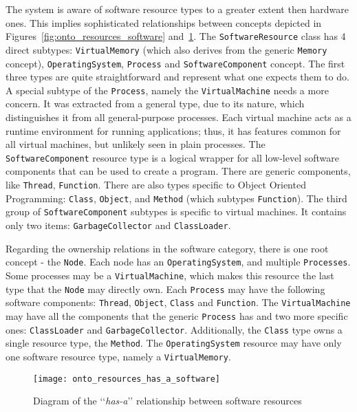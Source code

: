The system is aware of software resource types to a greater extent then hardware ones. This implies sophisticated relationships between concepts depicted in Figures~\ref{fig:onto_resources_software} and~\ref{fig:onto_resources_has_a_software}. The \texttt{SoftwareResource} class has 4 direct subtypes: \texttt{VirtualMemory} (which also derives from the generic \texttt{Memory} concept), \texttt{OperatingSystem}, \texttt{Process} and \texttt{SoftwareComponent} concept. The first three types are quite straightforward and represent what one expects them to do. A special subtype of the \texttt{Process}, namely the \texttt{VirtualMachine} needs a more concern. It was extracted from a general type, due to its nature, which distinguishes it from all general-purpose processes. Each virtual machine acts as a runtime environment for running applications; thus, it has features common for all virtual machines, but unlikely seen in plain processes. The \texttt{SoftwareComponent} resource type is a logical wrapper for all low-level software components that can be used to create a program. There are generic components, like \texttt{Thread}, \texttt{Function}. There are also types specific to Object Oriented Programming: \texttt{Class}, \texttt{Object}, and \texttt{Method} (which subtypes \texttt{Function}). The third group of \texttt{SoftwareComponent} subtypes is specific to virtual machines. It contains only two items: \texttt{GarbageCollector} and \texttt{ClassLoader}.

Regarding the ownership relations in the software category, there is one root concept - the \texttt{Node}. Each node has an \texttt{OperatingSystem}, and multiple \texttt{Processes}. Some processes may be a \texttt{VirtualMachine}, which makes this resource the last type that the \texttt{Node} may directly own. Each \texttt{Process} may have the following software components: \texttt{Thread}, \texttt{Object}, \texttt{Class} and \texttt{Function}. The \texttt{VirtualMachine} may have all the components that the generic \texttt{Process} has and two more specific ones: \texttt{ClassLoader} and \texttt{GarbageCollector}. Additionally, the \texttt{Class} type owns a single resource type, the \texttt{Method}. The \texttt{OperatingSystem} resource may have only one software resource type, namely a \texttt{VirtualMemory}.

\begin{figure}[ht]
\centering
\texttt{[image: onto\_resources\_has\_a\_software]}
\caption{Diagram of the \lq\lq{}\emph{has-a}\rq\rq{} relationship between software resources}
\label{fig:onto_resources_has_a_software}
\end{figure}

